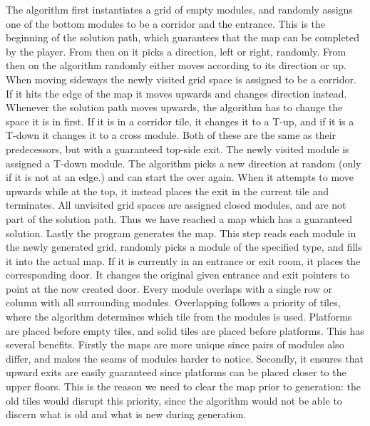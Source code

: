 The algorithm first instantiates a grid of empty modules, and randomly assigns one of the bottom modules to be a corridor and the entrance. This is the beginning of the solution path, which guarantees that the map can be completed by the player. From then on it picks a direction, left or right, randomly. From then on the algorithm randomly either moves according to its direction or up. When moving sideways the newly visited grid space is assigned to be a corridor. If it hits the edge of the map it moves upwards and changes direction instead. Whenever the solution path moves upwards, the algorithm has to change the space it is in first. If it is in a corridor tile, it changes it to a T-up, and if it is a T-down it changes it to a cross module. Both of these are the same as their predecessors, but with a guaranteed top-side exit. The newly visited module is assigned a T-down module. The algorithm picks a new direction at random (only if it is not at an edge.) and can start the over again. When it attempts to move upwards while at the top, it instead places the exit in the current tile and terminates. All unvisited grid spaces are assigned closed modules, and are not part of the solution path. Thus we have reached a map which has a guaranteed solution.
\newline
Lastly the program generates the map. This step reads each module in the newly generated grid, randomly picks a module of the specified type, and fills it into the actual map. If it is currently in an entrance or exit room, it places the corresponding door. It changes the original given entrance and exit pointers to point at the now created door.
\newline
Every module overlaps with a single row or column with all surrounding modules. Overlapping follows a priority of tiles, where the algorithm determines which tile from the modules is used. Platforms are placed before empty tiles, and solid tiles are placed before platforms. This has several benefits. Firstly the maps are more unique since pairs of modules also differ, and makes the seams of modules harder to notice. Secondly, it ensures that upward exits are easily guaranteed since platforms can be placed closer to the upper floors. This is the reason we need to clear the map prior to generation: the old tiles would disrupt this priority, since the algorithm would not be able to discern what is old and what is new during generation.

